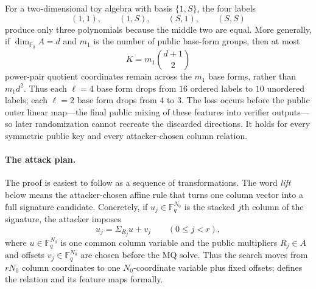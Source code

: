 \documentclass[11pt]{article}
\newcommand{\F}{\mathbb F}
\begin{document}
For a two-dimensional toy algebra with basis $\{1,S\}$, the four labels
\[
 (1,1),\qquad(1,S),\qquad(S,1),\qquad(S,S)
\]
produce only three polynomials because the middle two are equal.  More
generally, if $\dim_{\F_q}A=d$ and $m_1$ is the number of public base-form
groups, then at most
\begin{equation}\label{eq:intro-K}
  K=m_1\binom{d+1}{2}
\end{equation}
power-pair quotient coordinates remain across the $m_1$ base forms, rather
than $m_1d^2$.  Thus each $\ell=4$ base form drops from $16$ ordered labels to
$10$ unordered labels; each $\ell=2$ base form drops from $4$ to $3$.  The
loss occurs before the public outer linear map---the final public mixing of
these features into verifier outputs---so later randomization cannot recreate
the discarded directions.  It holds for every symmetric public key
and every attacker-chosen column relation.

\begin{center}
\end{center}

\paragraph{The attack plan.}
The proof is easiest to follow as a sequence of transformations.  The
word \emph{lift} below means the attacker-chosen affine rule that turns one
column vector into a full signature candidate.  Concretely, if
$u_j\in\F_q^{N_0}$ is the stacked $j$th column of the signature, the attacker
imposes
\[
  u_j=\Sigma_{R_j}u+v_j\qquad(0\le j<r),
\]
where $u\in\F_q^{N_0}$ is one common column variable and the public
multipliers $R_j\in A$ and offsets $v_j\in\F_q^{N_0}$ are chosen before the
MQ solve.  Thus the search moves from $rN_0$ column coordinates to one
$N_0$-coordinate variable plus fixed offsets; 
defines the relation and its feature maps formally.
\end{document}
